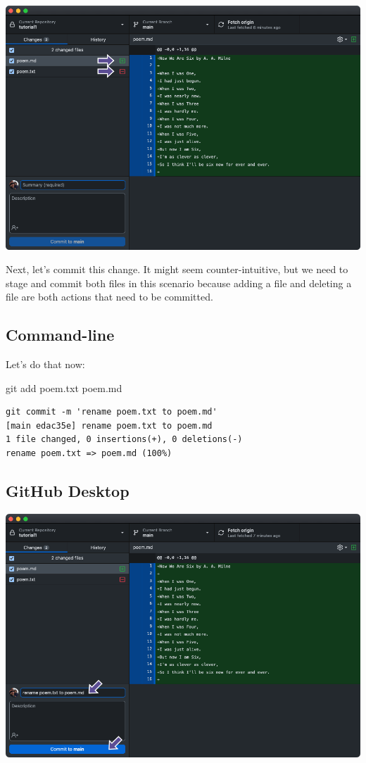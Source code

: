 \documentclass[
  letterpaper,
  DIV=11,
  numbers=noendperiod]{scrartcl}
\newenvironment{Shaded}{\begin{snugshade}}{\end{snugshade}}
\newcommand{\NormalTok}[1]{\textcolor[rgb]{0.00,0.23,0.31}{#1}}
\begin{document}
\includegraphics{images/image19_1.png}

Next, let's commit this change. It might seem counter-intuitive, but we
need to stage and commit both files in this scenario because adding a
file and deleting a file are both actions that need to be committed.

\subsection{Command-line}

Let's do that now:

\begin{Shaded}
\begin{Highlighting}[]
\NormalTok{git add poem.txt poem.md}
\end{Highlighting}
\end{Shaded}

\begin{verbatim}
git commit -m 'rename poem.txt to poem.md'
[main edac35e] rename poem.txt to poem.md
1 file changed, 0 insertions(+), 0 deletions(-)
rename poem.txt => poem.md (100%)
\end{verbatim}

\subsection{GitHub Desktop}

\includegraphics{images/image20.png}
\end{document}
